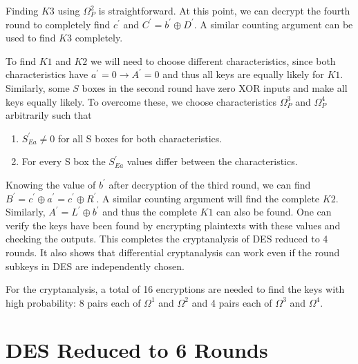 \documentclass[twoside]{article}
\begin{document}
Finding \(K3\) using \(\Omega_P^2\) is straightforward. At this point, we can
decrypt the fourth round to completely find \(c^\prime\) and \(C^\prime =
b^\prime \oplus D^\prime\). A similar counting argument can be used to find
\(K3\) completely.

To find \(K1\) and \(K2\) we will need to choose different characteristics,
since both characteristics have \(a^\prime = 0 \rightarrow A^\prime = 0\) and
thus all keys are equally likely for \(K1\). Similarly, some \(S\) boxes in the
second round have zero XOR inputs and make all keys equally likely. To overcome
these, we choose characteristics \(\Omega_P^3\) and \(\Omega_P^4\) arbitrarily
such that
\begin{enumerate}
    \item \(S^\prime_{Ea} \neq 0\) for all S boxes for both characteristics.
    \item For every S box the \(S^\prime_{Ea}\) values differ between the
    characteristics.
\end{enumerate}

Knowing the value of \(b^\prime\) after decryption of the third round, we can
find \(B^\prime = c^\prime \oplus a^\prime = c^\prime \oplus R^\prime\). A
similar counting argument will find the complete \(K2\). Similarly, \(A^\prime =
L^\prime \oplus b^\prime\) and thus the complete \(K1\) can also be found. One
can verify the keys have been found by encrypting plaintexts with these values
and checking the outputs. This completes the cryptanalysis of DES reduced to 4
rounds. It also shows that differential cryptanalysis can work even if the round
subkeys in DES are independently chosen.

For the cryptanalysis, a total of 16 encryptions are needed to find the keys
with high probability: 8 pairs each of \(\Omega^1\) and \(\Omega^2\) and 4 pairs
each of \(\Omega^3\) and \(\Omega^4\).

\section{DES Reduced to 6 Rounds}
\end{document}
